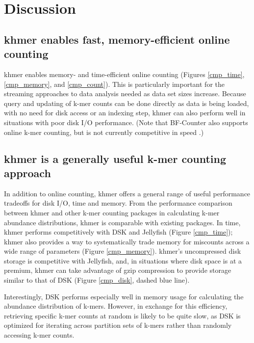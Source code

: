 \documentclass{article}
\begin{document}

\section{Discussion}

\subsection{khmer enables fast, memory-efficient online counting}

khmer enables memory- and time-efficient online counting (Figures \ref{cmp_time}, \ref{cmp_memory}, and \ref{cmp_count}).  This is
particularly important for the streaming approaches to data analysis
needed as data set sizes increase.  Because query and updating of
k-mer counts can be done directly as data is being loaded, with no
need for disk access or an indexing step, khmer can also perform
well in situations with poor disk I/O performance.  (Note that BF-Counter
also supports online k-mer counting, but is not currently competitive
in speed \cite{Deorowicz2013}.)

\subsection{khmer is a generally useful k-mer counting approach}

In addition to online counting, khmer offers a general range of useful
performance tradeoffs for disk I/O, time and memory.  From the
performance comparison between khmer and other k-mer counting packages
in calculating k-mer abundance distributions, khmer is comparable with
existing packages.  In time, khmer performs competitively with DSK and
Jellyfish (Figure \ref{cmp_time}); khmer also provides a way to systematically trade memory
for miscounts across a wide range of parameters (Figure \ref{cmp_memory}).  khmer's
uncompressed disk storage is competitive with Jellyfish, and, in
situations where disk space is at a premium, khmer can take advantage
of gzip compression to provide storage similar to that of DSK (Figure \ref{cmp_disk}, dashed blue line).

Interestingly, DSK performs especially well in memory usage
for calculating the abundance distribution of k-mers. However, in
exchange for this efficiency, retrieving specific k-mer counts at
random is likely to be quite slow, as DSK is optimized for iterating
across partition sets of k-mers rather than randomly accessing k-mer
counts.
\end{document}
